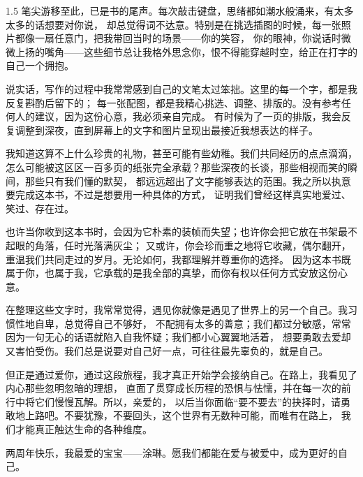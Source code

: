 

\large
\begin{spacing}{1.5}
    笔尖游移至此，已是书的尾声。每次敲击键盘，思绪都如潮水般涌来，有太多太多的话想要对你说，
    却总觉得词不达意。特别是在挑选插图的时候，每一张照片都像一扇任意门，把我带回当时的场景——你的笑容，
    你的眼神，你说话时微微上扬的嘴角——这些细节总让我格外思念你，恨不得能穿越时空，给正在打字的自己一个拥抱。

    说实话，写作的过程中我常常感到自己的文笔太过笨拙。这里的每一个字，都是我反复斟酌后留下的；
    每一张配图，都是我精心挑选、调整、排版的。没有参考任何人的建议，因为这份心意，我必须亲自完成。
    有时候为了一页的排版，我会反复调整到深夜，直到屏幕上的文字和图片呈现出最接近我想表达的样子。

    我知道这算不上什么珍贵的礼物，甚至可能有些幼稚。我们共同经历的点点滴滴，
    怎么可能被这区区一百多页的纸张完全承载？那些深夜的长谈，那些相视而笑的瞬间，那些只有我们懂的默契，
    都远远超出了文字能够表达的范围。我之所以执意要完成这本书，不过是想要用一种具体的方式，
    证明我们曾经这样真实地爱过、笑过、存在过。

    也许当你收到这本书时，会因为它朴素的装帧而失望；也许你会把它放在书架最不起眼的角落，任时光落满灰尘；
    又或许，你会珍而重之地将它收藏，偶尔翻开，重温我们共同走过的岁月。无论如何，我都理解并尊重你的选择。
    因为这本书既属于你，也属于我，它承载的是我全部的真挚，而你有权以任何方式安放这份心意。

    在整理这些文字时，我常常觉得，遇见你就像是遇见了世界上的另一个自己。我习惯性地自卑，总觉得自己不够好，
    不配拥有太多的善意；我们都过分敏感，常常因为一句无心的话语就陷入自我怀疑；我们都小心翼翼地活着，
    想要勇敢去爱却又害怕受伤。我们总是说要对自己好一点，可往往最先辜负的，就是自己。

    但正是通过爱你，通过这段旅程，我才真正开始学会接纳自己。在路上，我看见了内心那些忽明忽暗的理想，
    直面了贯穿成长历程的恐惧与怯懦，并在每一次的前行中将它们慢慢瓦解。所以，亲爱的，
    以后当你面临“要不要去”的抉择时，请勇敢地上路吧。不要犹豫，不要回头，这个世界有无数种可能，而唯有在路上，
    我们才能真正触达生命的各种维度。

    两周年快乐，我最爱的宝宝——涂琳。愿我们都能在爱与被爱中，成为更好的自己。

\end{spacing}

\clearpage


